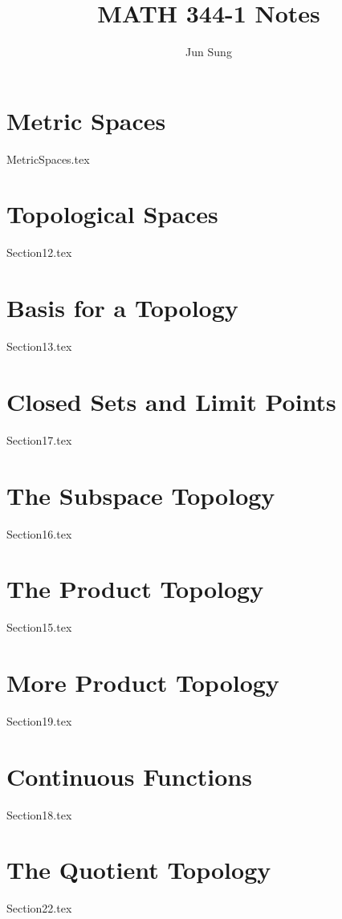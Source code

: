 \documentclass[12pt, oneside]{memoir}
\title{MATH 344-1 Notes}
\author{Jun Sung}
\date{}
\begin{document}
\maketitle
\newpage 

\tableofcontents
\newpage

\chapter{Metric Spaces}
{MetricSpaces.tex}

\chapter{Topological Spaces}
{Section12.tex}

\chapter{Basis for a Topology}
{Section13.tex}

\chapter{Closed Sets and Limit Points}
{Section17.tex}

\chapter{The Subspace Topology}
{Section16.tex}

\chapter{The Product Topology}
{Section15.tex}

\chapter{More Product Topology}
{Section19.tex}

\chapter{Continuous Functions}
{Section18.tex}

\chapter{The Quotient Topology}
{Section22.tex}
\end{document}
